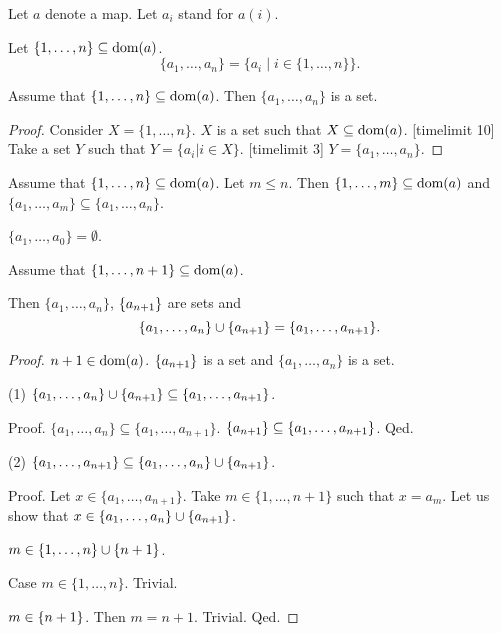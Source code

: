 \documentclass[11pt]{article}
\newcommand{\Seq}[2]{\{#1,\dots,#2\}}
\newcommand{\FinSet}[3]{\{#1_{#2},\dots,#1_{#3}\}}
\begin{document}
\begin{forthel}
Let $a$ denote a map.
Let $a_{i}$ stand for $a(i)$.

\begin{definition}
Let $\Seq{1}{n} \subseteq \dom(a)$.
$$\FinSet{a}{1}{n} = \{ a_{i} \mid i \in \Seq{1}{n}\}.$$
\end{definition}


\begin{lemma}
Assume that $\Seq{1}{n} \subseteq \dom(a)$.
Then $\FinSet{a}{1}{n}$ is a set.
\end{lemma}
\begin{proof}
Consider $X = \Seq{1}{n}$. $X$ is a set such that $X \subseteq \textrm{dom}(a)$.
[timelimit 10]
Take a set $Y$ such that $Y = \{ a_{i} | i \in X\}$.
[timelimit 3]
$Y = \FinSet{a}{1}{n}$.
\end{proof}


\begin{lemma}
Assume that $\Seq{1}{n} \subseteq \dom(a)$.
Let $m \leq n$. Then $\Seq{1}{m} \subseteq \dom(a)$ and
$\FinSet{a}{1}{m} \subseteq \FinSet{a}{1}{n}$.
\end{lemma}

\begin{lemma}
$\FinSet{a}{1}{0} = \emptyset$.
\end{lemma}

\begin{lemma}
Assume that $\Seq{1}{n+1} \subseteq \dom(a)$. 

Then
$\FinSet{a}{1}{n}$, $\{a_{n+1}\}$ are sets and
$$\FinSet{a}{1}{n} \cup \sing{a_{n+1}} = \FinSet{a}{1}{n+1}.$$
\end{lemma}
\begin{proof}
$n+1 \in \textrm{dom}(a)$.
$\{a_{n+1}\}$ is a set and $\FinSet{a}{1}{n}$ is a set.

(1) $\FinSet{a}{1}{n} \cup \sing{a_{n+1}} \subseteq \FinSet{a}{1}{n+1}$.

Proof.
$\FinSet{a}{1}{n} \subseteq \FinSet{a}{1}{n+1}$.
$\sing{a_{n+1}}  \subseteq \FinSet{a}{1}{n+1}$.
Qed.

(2) $\FinSet{a}{1}{n+1} \subseteq \FinSet{a}{1}{n} \cup \sing{a_{n+1}}$.

Proof.
Let $x \in \FinSet{a}{1}{n+1}$. Take $m \in \Seq{1}{n+1}$ such that
$x = a_{m}$. Let us show that $x \in \FinSet{a}{1}{n} \cup \sing{a_{n+1}}$.

$m \in \Seq{1}{n} \cup \sing{n+1}$.

Case $m \in \Seq{1}{n}$. Trivial.

$m \in \{n+1\}$. Then $m = n+1$. Trivial.
Qed.


\end{proof}
\end{forthel}
\end{document}

